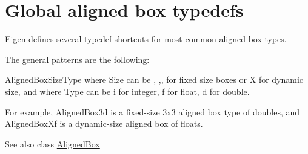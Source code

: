 \hypertarget{group__alignedboxtypedefs}{}\section{Global aligned box typedefs}
\label{group__alignedboxtypedefs}
\hyperlink{namespace_eigen}{Eigen} defines several typedef shortcuts for most common aligned box types.

The general patterns are the following\+:

{\ttfamily Aligned\+Box\+Size\+Type} where {\ttfamily Size} can be {}, {},{},{} for fixed size boxes or {\ttfamily X} for dynamic size, and where {\ttfamily Type} can be {\ttfamily i} for integer, {\ttfamily f} for float, {\ttfamily d} for double.

For example, {\ttfamily Aligned\+Box3d} is a fixed-\/size 3x3 aligned box type of doubles, and {\ttfamily Aligned\+Box\+Xf} is a dynamic-\/size aligned box of floats.

\begin{DoxySeeAlso}{See also}
class \hyperlink{group___geometry___module_class_eigen_1_1_aligned_box}{Aligned\+Box} 
\end{DoxySeeAlso}
